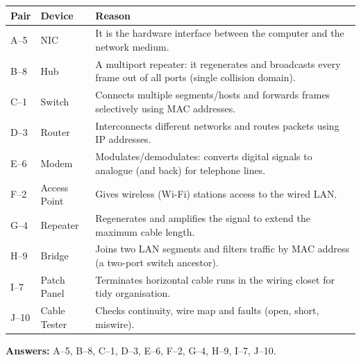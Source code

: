 \documentclass[11pt]{article}
\begin{document}
\begin{corrige}
\begin{center}
\begin{tabularx}{\linewidth}{|l|l|X|}\hline
\rowcolor{popblueL}\textbf{Pair} & \textbf{Device} & \textbf{Reason} \\ \hline
A--5 & NIC & It is the hardware interface between the computer and the network medium. \\ \hline
B--8 & Hub & A multiport repeater: it regenerates and broadcasts every frame out of all ports (single collision domain). \\ \hline
C--1 & Switch & Connects multiple segments/hosts and forwards frames selectively using MAC addresses. \\ \hline
D--3 & Router & Interconnects different networks and routes packets using IP addresses. \\ \hline
E--6 & Modem & Modulates/demodulates: converts digital signals to analogue (and back) for telephone lines. \\ \hline
F--2 & Access Point & Gives wireless (Wi-Fi) stations access to the wired LAN. \\ \hline
G--4 & Repeater & Regenerates and amplifies the signal to extend the maximum cable length. \\ \hline
H--9 & Bridge & Joins two LAN segments and filters traffic by MAC address (a two-port switch ancestor). \\ \hline
I--7 & Patch Panel & Terminates horizontal cable runs in the wiring closet for tidy organisation. \\ \hline
J--10 & Cable Tester & Checks continuity, wire map and faults (open, short, miswire). \\ \hline
\end{tabularx}
\end{center}
\textbf{Answers:} A–5, B–8, C–1, D–3, E–6, F–2, G–4, H–9, I–7, J–10.
\end{corrige}
\end{document}
